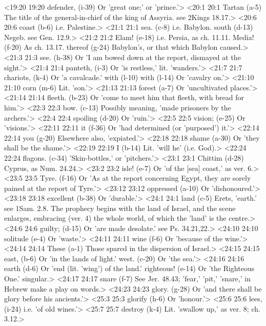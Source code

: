 <19:20 19:20  defender, (i-39)  Or 'great one;' or 'prince.'>
<20:1 20:1  Tartan (a-5)  The title of the general-in-chief of the king of Assyria. see  2Kings 18.17.>
<20:6 20:6  coast (b-6)  i.e. Palestine.>
<21:1 21:1  sea. (c-8)  i.e. Babylon.
  south (d-13)  Negeb. see Gen. 12.9.>
<21:2 21:2  Elam! (e-18)  i.e. Persia, as ch. 11.11.
  Media! (f-20)  As ch. 13.17.
  thereof (g-24)  Babylon's, or that which Babylon caused.>
<21:3 21:3  see. (h-38)  Or 'I am bowed down at the report, dismayed at the sight.'>
<21:4 21:4  panteth, (i-3)  Or 'is restless,' lit. 'wanders.'>
<21:7 21:7  chariots, (k-4)  Or 'a cavalcade.'
  with (l-10)  with (l-14)
  Or 'cavalry on.'>
<21:10 21:10  corn (m-6)  Lit. 'son.'>
<21:13 21:13  forest (a-7)  Or 'uncultivated places.'>
<21:14 21:14  fleeth. (b-23)  Or 'come to meet him that fleeth, with bread for him.'>
<22:3 22:3  bow. (c-13)  Possibly meaning, 'made prisoners by the archers.'>
<22:4 22:4  spoiling (d-20)  Or 'ruin.'>
<22:5 22:5  vision; (e-25)  Or 'visions.'>
<22:11 22:11  it (f-36)  Or 'had determined (or 'purposed') it.'>
<22:14 22:14  you (g-20)  Elsewhere also, 'expiated.'>
<22:18 22:18  shame (a-30)  Or 'they shall be the shame.'>
<22:19 22:19  I (b-14)  Lit. 'will he' (i.e. God).>
<22:24 22:24  flagons. (c-34)  'Skin-bottles,' or 'pitchers.'>
<23:1 23:1  Chittim (d-28)  Cyprus, as Num. 24.24.>
<23:2 23:2  isle! (e-7)  Or 'of the [sea] coast,' as ver. 6.>
<23:5 23:5  Tyre. (f-16)  Or 'As at the report concerning Egypt, they are sorely pained  at the report of Tyre.'>
<23:12 23:12  oppressed (a-10)  Or 'dishonoured.'>
<23:18 23:18  excellent (b-38)  Or 'durable.'>
<24:1 24:1  land (c-5)  Erets, 'earth.' see 1Sam. 2.8. The prophecy begins with  the land of Israel, and the scene enlarges, embracing (ver. 4)  the whole world, of which the 'land' is the centre.>
<24:6 24:6  guilty; (d-15)  Or 'are made desolate.' see Ps. 34.21,22.>
<24:10 24:10  solitude (e-4)  Or 'waste.'>
<24:11 24:11  wine (f-6)  Or 'because of the wine.'>
<24:14 24:14  These (a-1)  Those spared in the dispersion of Israel.>
<24:15 24:15  east, (b-6)  Or 'in the lands of light.'
  west. (c-20)  Or 'the sea.'>
<24:16 24:16  earth (d-6)  Or 'end (lit. 'wing') of the land.'
  righteous! (e-14)  Or 'the Righteous One.' singular.>
<24:17 24:17  snare (f-7)  See Jer. 48.43; 'fear,' 'pit,' 'snare,' in Hebrew make a play  on words.>
<24:23 24:23  glory. (g-28)  Or 'and there shall be glory before his ancients.'>
<25:3 25:3  glorify (h-6)  Or 'honour.'>
<25:6 25:6  lees, (i-24)  i.e. 'of old wines.'>
<25:7 25:7  destroy (k-4)  Lit. 'swallow up,' as ver. 8; ch. 3.12.>
